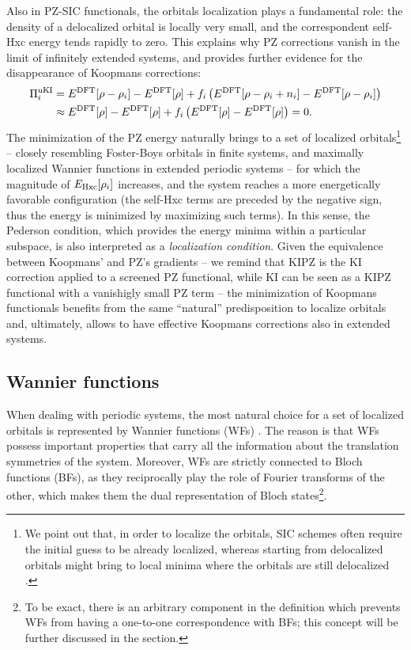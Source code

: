 Also in PZ-SIC functionals, the orbitals localization plays a fundamental role: the density of a delocalized orbital is locally very small, and the correspondent self-Hxc energy tends rapidly to zero. This explains why PZ corrections vanish in the limit of infinitely extended systems, and provides further evidence for the disappearance of Koopmans corrections:
%
\begin{equation}
    \begin{split}
    \Pi_i^{\rm uKI} &= E^{\rm DFT}[\rho - \rho_i] - E^{\rm DFT}[\rho] + f_i \left( E^{\rm DFT}[\rho - \rho_i + n_i] - E^{\rm DFT}[\rho - \rho_i] \right) \\
    &\approx E^{\rm DFT}[\rho] - E^{\rm DFT}[\rho] + f_i \left( E^{\rm DFT}[\rho] - E^{\rm DFT}[\rho] \right) = 0 .
    \end{split}
    \label{eq:vanishing-ki-correction}
\end{equation}
%
The minimization of the PZ energy naturally brings to a set of localized orbitals\footnote{We point out that, in order to localize the orbitals, SIC schemes often require the initial guess to be already localized, whereas starting from delocalized orbitals might bring to local minima where the orbitals are still delocalized \cite{korzdorfer_relation_2011}.} -- closely resembling Foster-Boys orbitals \cite{boys_construction_1960,foster_canonical_1960} in finite systems, and maximally localized Wannier functions \cite{marzari_maximally_1997,marzari_maximally_2012} in extended periodic systems \cite{nguyen_koopmans-compliant_2018} -- for which the magnitude of $E_{\rm Hxc}[\rho_i]$ increases, and the system reaches a more energetically favorable configuration (the self-Hxc terms are preceded by the negative sign, thus the energy is minimized by maximizing such terms). In this sense, the Pederson condition, which provides the energy minima within a particular subspace, is also interpreted as a \emph{localization condition}. Given the equivalence between Koopmans' and PZ's gradients -- we remind that KIPZ is the KI correction applied to a screened PZ functional, while KI can be seen as a KIPZ functional with a vanishigly small PZ term -- the minimization of Koopmans functionals benefits from the same ``natural'' predisposition to localize orbitals and, ultimately, allows to have effective Koopmans corrections also in extended systems.

\subsection{Wannier functions\label{sec:wannier-functions}}
When dealing with periodic systems, the most natural choice for a set of localized orbitals is represented by Wannier functions (WFs) \cite{wannier_structure_1937}. The reason is that WFs possess important properties that carry all the information about the translation symmetries of the system. Moreover, WFs are strictly connected to Bloch functions (BFs), as they reciprocally play the role of Fourier transforms of the other, which makes them the dual representation of Bloch states\footnote{To be exact, there is an arbitrary component in the definition which prevents WFs from having a one-to-one correspondence with BFs; this concept will be further discussed in the section.}.

